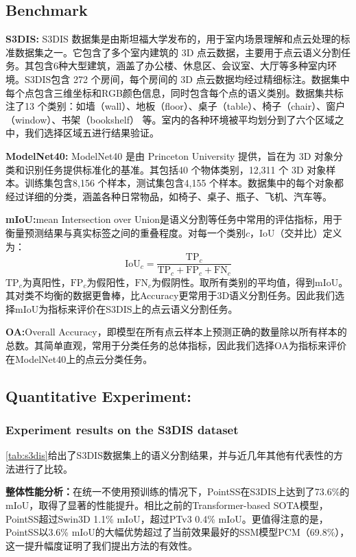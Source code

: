 \documentclass[preprint,12pt]{elsarticle}
\begin{document}
\subsection{Benchmark}
\textbf{S3DIS:}
S3DIS 数据集是由斯坦福大学发布的，用于室内场景理解和点云处理的标准数据集之一。它包含了多个室内建筑的 3D 点云数据，主要用于点云语义分割任务。其包含6种大型建筑，涵盖了办公楼、休息区、会议室、大厅等多种室内环境。S3DIS包含 272 个房间，每个房间的 3D 点云数据均经过精细标注。数据集中每个点包含三维坐标和RGB颜色信息，同时包含每个点的语义类别。数据集共标注了13 个类别：如墙（wall）、地板（floor）、桌子（table）、椅子（chair）、窗户（window）、书架（bookshelf） 等。室内的各种环境被平均划分到了六个区域之中，我们选择区域五进行结果验证。


\textbf{ModelNet40:}
ModelNet40 是由 Princeton University 提供，旨在为 3D 对象分类和识别任务提供标准化的基准。其包括40 个物体类别，12,311 个 3D 对象样本。训练集包含8,156 个样本，测试集包含4,155 个样本。数据集中的每个对象都经过详细的分类，涵盖各种日常物品，如椅子、桌子、瓶子、飞机、汽车等。


\textbf{mIoU:}mean Intersection over Union是语义分割等任务中常用的评估指标，用于衡量预测结果与真实标签之间的重叠程度。对每一个类别$c$，IoU（交并比）定义为：\begin{equation}\mathrm{IoU}_c=\frac{\mathrm{TP}_c}{\mathrm{TP}_c+\mathrm{FP}_c+\mathrm{FN}_c}\end{equation}
$\mathrm{TP}_{c}$为真阳性，$\mathrm{FP}_{c}$为假阳性，$\mathrm{FN}_{c}$为假阴性。取所有类别的平均值，得到mIoU。其对类不均衡的数据更鲁棒，比Accuracy更常用于3D语义分割任务。因此我们选择mIoU为指标来评价在S3DIS上的点云语义分割任务。

\textbf{OA:}Overall Accuracy，即模型在所有点云样本上预测正确的数量除以所有样本的总数。其简单直观，常用于分类任务的总体指标，因此我们选择OA为指标来评价在ModelNet40上的点云分类任务。

\subsection{Quantitative Experiment:}
\subsubsection{Experiment results on the S3DIS dataset}
\cref{tab:s3dis}给出了S3DIS数据集上的语义分割结果，并与近几年其他有代表性的方法进行了比较。

\textbf{整体性能分析：}在统一不使用预训练的情况下，PointSS在S3DIS上达到了73.6\%的mIoU，取得了显著的性能提升。相比之前的Transformer-based SOTA模型，PointSS超过Swin3D 1.1\% mIoU，超过PTv3 0.4\% mIoU。更值得注意的是，PointSS以3.6\% mIoU的大幅优势超过了当前效果最好的SSM模型PCM（69.8\%），这一提升幅度证明了我们提出方法的有效性。
\end{document}
